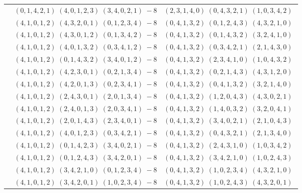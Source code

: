 \documentclass[11pt]{article}
\begin{document}
\begin{longtable}[l]{|c|c|c|}
 \cline{2-3} 
 & $(0 ,1 ,4 ,2 ,1) \;(4 ,0 ,1 ,2 ,3) \;(3 ,4 ,0 ,2 ,1) \;-8$ & $(2 ,3 ,1 ,4 ,0) \;(0 ,4 ,3 ,2 ,1) \;(1 ,0 ,3 ,4 ,2) \;$\\ 
 \cline{2-3} 
 & $(4 ,1 ,0 ,1 ,2) \;(4 ,3 ,2 ,0 ,1) \;(0 ,1 ,2 ,3 ,4) \;-8$ & $(0 ,4 ,1 ,3 ,2) \;(0 ,1 ,2 ,4 ,3) \;(4 ,3 ,2 ,1 ,0) \;$\\ 
 \cline{2-3} 
 & $(4 ,1 ,0 ,1 ,2) \;(4 ,3 ,0 ,1 ,2) \;(0 ,1 ,3 ,4 ,2) \;-8$ & $(0 ,4 ,1 ,3 ,2) \;(0 ,1 ,4 ,3 ,2) \;(3 ,2 ,4 ,1 ,0) \;$\\ 
 \cline{2-3} 
 & $(4 ,1 ,0 ,1 ,2) \;(4 ,0 ,1 ,3 ,2) \;(0 ,3 ,4 ,1 ,2) \;-8$ & $(0 ,4 ,1 ,3 ,2) \;(0 ,3 ,4 ,2 ,1) \;(2 ,1 ,4 ,3 ,0) \;$\\ 
 \cline{2-3} 
 & $(4 ,1 ,0 ,1 ,2) \;(0 ,1 ,4 ,3 ,2) \;(3 ,4 ,0 ,1 ,2) \;-8$ & $(0 ,4 ,1 ,3 ,2) \;(2 ,3 ,4 ,1 ,0) \;(1 ,0 ,4 ,3 ,2) \;$\\ 
 \cline{2-3} 
 & $(4 ,1 ,0 ,1 ,2) \;(4 ,2 ,3 ,0 ,1) \;(0 ,2 ,1 ,3 ,4) \;-8$ & $(0 ,4 ,1 ,3 ,2) \;(0 ,2 ,1 ,4 ,3) \;(4 ,3 ,1 ,2 ,0) \;$\\ 
 \cline{2-3} 
 & $(4 ,1 ,0 ,1 ,2) \;(4 ,2 ,0 ,1 ,3) \;(0 ,2 ,3 ,4 ,1) \;-8$ & $(0 ,4 ,1 ,3 ,2) \;(0 ,4 ,1 ,3 ,2) \;(3 ,2 ,1 ,4 ,0) \;$\\ 
 \cline{2-3} 
 & $(4 ,1 ,0 ,1 ,2) \;(2 ,4 ,3 ,0 ,1) \;(2 ,0 ,1 ,3 ,4) \;-8$ & $(0 ,4 ,1 ,3 ,2) \;(1 ,2 ,0 ,4 ,3) \;(4 ,3 ,0 ,2 ,1) \;$\\ 
 \cline{2-3} 
 & $(4 ,1 ,0 ,1 ,2) \;(2 ,4 ,0 ,1 ,3) \;(2 ,0 ,3 ,4 ,1) \;-8$ & $(0 ,4 ,1 ,3 ,2) \;(1 ,4 ,0 ,3 ,2) \;(3 ,2 ,0 ,4 ,1) \;$\\ 
 \cline{2-3} 
 & $(4 ,1 ,0 ,1 ,2) \;(2 ,0 ,1 ,4 ,3) \;(2 ,3 ,4 ,0 ,1) \;-8$ & $(0 ,4 ,1 ,3 ,2) \;(3 ,4 ,0 ,2 ,1) \;(2 ,1 ,0 ,4 ,3) \;$\\ 
 \cline{2-3} 
 & $(4 ,1 ,0 ,1 ,2) \;(4 ,0 ,1 ,2 ,3) \;(0 ,3 ,4 ,2 ,1) \;-8$ & $(0 ,4 ,1 ,3 ,2) \;(0 ,4 ,3 ,2 ,1) \;(2 ,1 ,3 ,4 ,0) \;$\\ 
 \cline{2-3} 
 & $(4 ,1 ,0 ,1 ,2) \;(0 ,1 ,4 ,2 ,3) \;(3 ,4 ,0 ,2 ,1) \;-8$ & $(0 ,4 ,1 ,3 ,2) \;(2 ,4 ,3 ,1 ,0) \;(1 ,0 ,3 ,4 ,2) \;$\\ 
 \cline{2-3} 
 & $(4 ,1 ,0 ,1 ,2) \;(0 ,1 ,2 ,4 ,3) \;(3 ,4 ,2 ,0 ,1) \;-8$ & $(0 ,4 ,1 ,3 ,2) \;(3 ,4 ,2 ,1 ,0) \;(1 ,0 ,2 ,4 ,3) \;$\\ 
 \cline{2-3} 
 & $(4 ,1 ,0 ,1 ,2) \;(3 ,4 ,2 ,1 ,0) \;(0 ,1 ,2 ,3 ,4) \;-8$ & $(0 ,4 ,1 ,3 ,2) \;(1 ,0 ,2 ,3 ,4) \;(4 ,3 ,2 ,1 ,0) \;$\\ 
 \cline{2-3} 
 & $(4 ,1 ,0 ,1 ,2) \;(3 ,4 ,2 ,0 ,1) \;(1 ,0 ,2 ,3 ,4) \;-8$ & $(0 ,4 ,1 ,3 ,2) \;(1 ,0 ,2 ,4 ,3) \;(4 ,3 ,2 ,0 ,1) \;$\\ 

\end{longtable}
\end{document}
